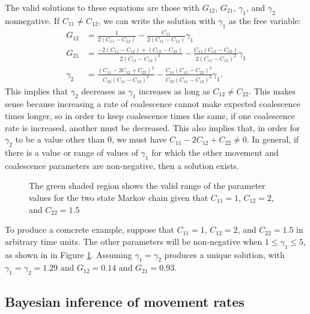 \documentclass{article}
\begin{document}
The valid solutions to these equations are those with $G_{12}$, $G_{21}$, $\gamma_1$,
and $\gamma_2$ nonnegative.
If $C_{11} \neq C_{12}$, 
we can write the solution with $\gamma_1$ as the free variable:
\begin{align*}
G_{12} &= \frac{1}{2(C_{11} - C_{12})} - \frac{C_{11}}{2(C_{11} - C_{12})}\gamma_1 \\
G_{21} &= \frac{-2(C_{11} - C_{12}) + (C_{12} - C_{22})}{2(C_{11} - C_{12})^2}
	- \frac{C_{11}(C_{12} - C_{22})}{2(C_{11} - C_{12})^2}\gamma_1 \\
\gamma_2 &= \frac{(C_{11} - 2C_{12} + C_{22})^2}{C_{22}(C_{11} - C_{12})^2}
	- \frac{C_{11}(C_{12} - C_{22})^2}{C_{22}(C_{11} - C_{12})^2}\gamma_1.
\end{align*}
This implies that $\gamma_2$ decreases as $\gamma_1$ increases as long as $C_{12} \neq C_{22}$.
This makes sense because
increasing a rate of coalescence cannot make expected coalescence times longer,
so in order to keep coalescence times the same,
if one coalescence rate is increased, another must be decreased.
This also implies that, in order for $\gamma_2$ to be a value other than $0$, 
we must have $C_{11} - 2C_{12} + C_{22} \neq 0$.
In general, if there is a value or range of values of $\gamma_1$
for which the other movement and coalescence parameters are non-negative,
then a solution exists.

\begin{figure}
\centering
\caption{The green shaded region shows 
	the valid range of the parameter values
	for the two state Markov chain given that
	$C_{11}=1$, $C_{12}=2$, and $C_{22}=1.5$}
\label{fig:valid_range}
\end{figure}

To produce a comcrete example, suppose that
$C_{11} = 1$, $C_{12} = 2$, and $C_{22} = 1.5$ in arbitrary time units.
The other parameters will be non-negative 
when $1 \leq \gamma_1 \leq 5$,
as shown in in Figure \ref{fig:valid_range}.
Assuming $\gamma_1 = \gamma_2$ produces a unique solution, 
with $\gamma_1 = \gamma_2 = 1.29$ and $G_{12} = 0.14$ and $G_{21} = 0.93$.


\subsection*{Bayesian inference of movement rates}
\end{document}
